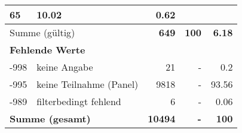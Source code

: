 \begin{longtable}{lXrrr}
       \num{65} &
       \num[round-mode=places,round-precision=2]{10,02} &
         \num[round-mode=places,round-precision=2]{0,62} \\
     \midrule
     \multicolumn{2}{l}{Summe (gültig)} &
       \textbf{\num{649}} &
     \textbf{100} &
       \textbf{\num[round-mode=places,round-precision=2]{6,18}} \\
     \multicolumn{5}{l}{\textbf{Fehlende Werte}}\\
       -998 &
       keine Angabe &
         \num{21} &
        - &
         \num[round-mode=places,round-precision=2]{0,2} \\
       -995 &
       keine Teilnahme (Panel) &
         \num{9818} &
        - &
         \num[round-mode=places,round-precision=2]{93,56} \\
       -989 &
       filterbedingt fehlend &
         \num{6} &
        - &
         \num[round-mode=places,round-precision=2]{0,06} \\
     \midrule
     \multicolumn{2}{l}{\textbf{Summe (gesamt)}} &
          \textbf{\num{10494}} &
        \textbf{-} &
        \textbf{100} \\
     \bottomrule
     \end{longtable}
     
